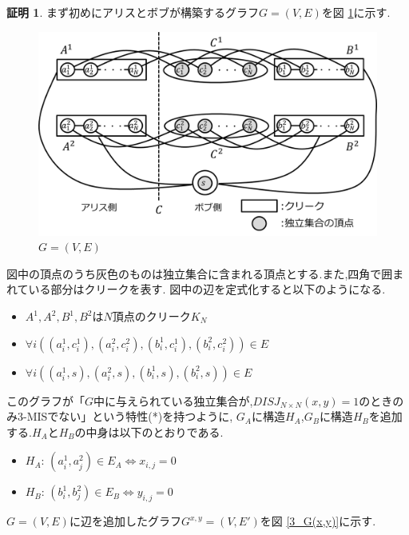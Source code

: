 \documentclass[12pt]{thesis}
\theoremstyle{definition}
\newtheorem*{prf*}{証明}
\begin{document}
\begin{prf*}
まず初めにアリスとボブが構築するグラフ$G = (V, E)$を図 \ref{3_G}に示す. 

\begin{figure}[ht]
\begin{center}
\includegraphics[width=120mm]{3_G.png}
\end{center}
\caption{$G = (V, E)$}
\label{3_G}
\end{figure}

図中の頂点のうち灰色のものは独立集合に含まれる頂点とする.また,四角で囲まれている部分はクリークを表す.
図中の辺を定式化すると以下のようになる.
\begin{itemize}
\item $A^{1}, A^{2}, B^{1}, B^{2}$は$N$頂点のクリーク$K_{N}$
\item $\forall i((a_{i}^{1}, c_{i}^{1}), (a_{i}^{2}, c_{i}^{2}), (b_{i}^{1}, c_{i}^{1}), (b_{i}^{2}, c_{i}^{2})) \in E$
\item $\forall i((a_{i}^{1}, s), (a_{i}^{2}, s), (b_{i}^{1}, s), (b_{i}^{2}, s)) \in E$
\end{itemize}

このグラフが「$G$中に与えられている独立集合が,$DISJ_{N \times N} (x, y) = 1$のときのみ3-MISでない」という特性(*)を持つように,
$G_{A}$に構造$H_{A}$,$G_{B}$に構造$H_{B}$を追加する.$H_{A}$と$H_{B}$の中身は以下のとおりである.
\newpage
\begin{itemize}
\item $H_{A}$: $(a_{i}^{1}, a_{j}^{2}) \in E_{A} \Leftrightarrow x_{i, j} = 0$
\item $H_{B}$: $(b_{i}^{1}, b_{j}^{2}) \in E_{B} \Leftrightarrow y_{i, j} = 0$
\end{itemize}

$G = (V, E)$に辺を追加したグラフ$G^{x, y} = (V, E')$を図 \ref{3_G(x,y)}に示す.


\end{prf*}
\end{document}
